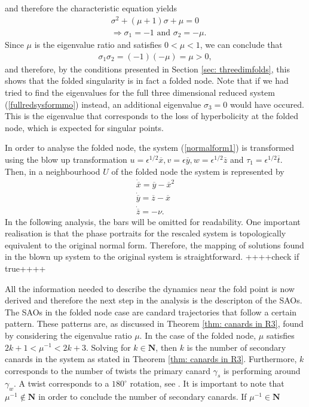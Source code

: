 and therefore the characteristic equation yields
\begin{align*}
&\sigma^2 +(\mu +1)\sigma + \mu = 0 \\
&\Rightarrow \sigma_1= -1 \textrm{\ \ \ and \ \ \ } \sigma_2 = -\mu.
\end{align*}
Since $\mu$ is the eigenvalue ratio and satisfies $0< \mu < 1$, we can conclude that 
\begin{align*}
\sigma_1\sigma_2 = (-1)(-\mu)=\mu >0,
\end{align*}
and therefore, by the conditions presented in Section \ref{sec: threedimfolds}, this shows that the folded singularity is in fact a folded node.
Note that if we had tried to find the eigenvalues for the full three dimensional reduced system (\ref{fullredsysformmo}) instead, an additional eigenvalue $\sigma_3=0$ would have occured. This is the eigenvalue that corresponds to the loss of hyperbolicity at the folded node, which is expected for singular points.

In order to analyse the folded node, the system (\ref{normalform1}) is transformed using the blow up transformation $u= \epsilon^{1/2}\overline{x}, v=\epsilon \overline{y}, w= \epsilon^{1/2} \overline{z}$ and $ \tau_1 = \epsilon^{1/2} \overline{t}$.
Then, in a neighbourhood $U$ of the folded node the system is represented by
\begin{align*}
\dot{\overline{x}}= \overline{y} - \overline{x}^2\\
\dot{\overline{y}}=\overline{z} - \overline{x} \\
\dot{\overline{z}}= - \nu.
\end{align*}
In the following analysis, the bars will be omitted for readability.
One important realisation is that the phase portraits for the rescaled system is topologically equivalent to the original normal form. Therefore, the mapping of solutions  found in the blown up system to the original system is straightforward. ++++check if true++++

All the information needed to describe the dynamics near the fold point is now derived and therefore the next step in the analysis is the descripton of the SAOs. The SAOs in the folded node case are candard trajectories that follow a certain pattern.
These patterns are, as discussed in Theorem \ref{thm: canards in R3}, found by considering the eigenvalue ratio $\mu$.
In the case of the folded node, $\mu$ satisfies $2k+1 < \mu^{-1} < 2k +3 $. Solving for $k \in \mathbf{N}$, then $k$ is the number of secondary canards in the system as stated in Theorem \ref{thm: canards in R3}. Furthermore, $k$ corresponds to the number of twists the primary canard $\gamma_s$ is performing around $\gamma_w$. A twist corresponds to a $180^{\circ}$ rotation, see \citet{kuehn}. It is important to note that $\mu^{-1} \notin \mathbf{N}$ in order to conclude the number of secondary canards.
If $\mu^{-1} \in \mathbf{N}$ 

